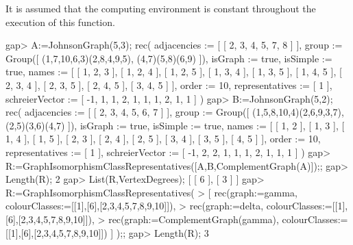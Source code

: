 It is assumed that the computing environment is constant throughout the 
execution of this function.

\beginexample 
gap> A:=JohnsonGraph(5,3);
rec( adjacencies := [ [ 2, 3, 4, 5, 7, 8 ] ], 
  group := Group([ (1,7,10,6,3)(2,8,4,9,5), (4,7)(5,8)(6,9) ]), 
  isGraph := true, isSimple := true, 
  names := [ [ 1, 2, 3 ], [ 1, 2, 4 ], [ 1, 2, 5 ], [ 1, 3, 4 ], [ 1, 3, 5 ], 
      [ 1, 4, 5 ], [ 2, 3, 4 ], [ 2, 3, 5 ], [ 2, 4, 5 ], [ 3, 4, 5 ] ], 
  order := 10, representatives := [ 1 ], 
  schreierVector := [ -1, 1, 1, 2, 1, 1, 1, 2, 1, 1 ] )
gap> B:=JohnsonGraph(5,2);
rec( adjacencies := [ [ 2, 3, 4, 5, 6, 7 ] ], 
  group := Group([ (1,5,8,10,4)(2,6,9,3,7), (2,5)(3,6)(4,7) ]), 
  isGraph := true, isSimple := true, 
  names := [ [ 1, 2 ], [ 1, 3 ], [ 1, 4 ], [ 1, 5 ], [ 2, 3 ], [ 2, 4 ], 
      [ 2, 5 ], [ 3, 4 ], [ 3, 5 ], [ 4, 5 ] ], order := 10, 
  representatives := [ 1 ], schreierVector := [ -1, 2, 2, 1, 1, 1, 2, 1, 1, 1 
     ] )
gap> R:=GraphIsomorphismClassRepresentatives([A,B,ComplementGraph(A)]);;
gap> Length(R);
2
gap> List(R,VertexDegrees);
[ [ 6 ], [ 3 ] ]
gap> R:=GraphIsomorphismClassRepresentatives( 
>    [ rec(graph:=gamma, colourClasses:=[[1],[6],[2,3,4,5,7,8,9,10]]), 
>      rec(graph:=delta, colourClasses:=[[1],[6],[2,3,4,5,7,8,9,10]]), 
>      rec(graph:=ComplementGraph(gamma), colourClasses:=[[1],[6],[2,3,4,5,7,8,9,10]]) ] );; 
gap> Length(R);
3
\endexample

